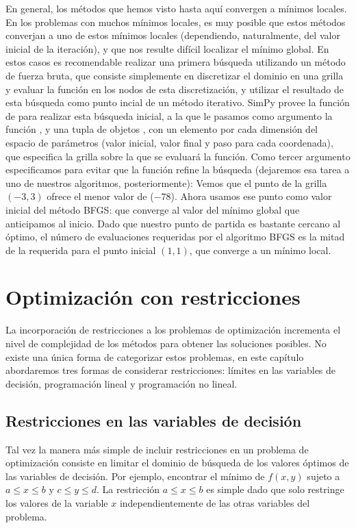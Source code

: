 En general, los métodos que hemos visto hasta aquí convergen a mínimos locales. En los problemas con muchos mínimos locales, es muy posible que estos métodos converjan a uno de estos mínimos locales (dependiendo, naturalmente, del valor inicial de la iteración), y que nos resulte difícil localizar el mínimo global. En estos casos es recomendable realizar una primera búsqueda utilizando un método de fuerza bruta, que consiste simplemente en discretizar el dominio en una grilla y evaluar la función en los nodos de esta discretización, y utilizar el resultado de esta búsqueda como punto incial de un método iterativo. SimPy provee la función  de  para realizar esta búsqueda inicial, a la que le pasamos como argumento la función , y una tupla de objetos , con un elemento por cada dimensión del espacio de parámetros (valor inicial, valor final y paso para cada coordenada), que especifica la grilla sobre la que se evaluará la función. Como tercer argumento especificamos  para evitar que la función  refine la búsqueda (dejaremos esa tarea a uno de nuestros algoritmos, posteriormente):
Vemos que el punto de la grilla $(-3, 3)$ ofrece el menor valor de  ($-78$). Ahora usamos ese punto como valor inicial del método BFGS:
\noindent que converge al valor del mínimo global que anticipamos al inicio. Dado que nuestro punto de partida es bastante cercano al óptimo, el número de evaluaciones requeridas por el algoritmo BFGS es la mitad de la requerida para el punto inicial $(1, 1)$, que converge a un mínimo local.

\section{Optimización con restricciones}

La incorporación de restricciones a los problemas de optimización incrementa el nivel de complejidad de los métodos para obtener las soluciones posibles. No existe una única forma de categorizar estos problemas, en este capítulo abordaremos tres formas de considerar restricciones: límites en las variables de decisión, programación lineal y programación no lineal.

\subsection{Restricciones en las variables de decisión}
Tal vez la manera más simple de incluir restricciones en un problema de optimización consiste en limitar el dominio de búsqueda de los valores óptimos de las variables de decisión. Por ejemplo, encontrar el mínimo de $f(x, y)$ sujeto a $a \leq x \leq b$ y $c \leq y \leq d$. La restricción $a \leq x \leq b$ es simple dado que solo restringe los valores de la variable $x$ independientemente de las otras variables del problema.

